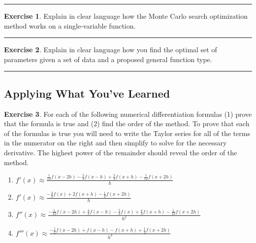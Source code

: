 \documentclass[
]{book}
\theoremstyle{definition}
\theoremstyle{definition}
\theoremstyle{definition}
\newtheorem{exercise}{Exercise}[chapter]
\theoremstyle{remark}
\begin{document}
\begin{center}\rule{0.5\linewidth}{0.5pt}\end{center}

\begin{exercise}
\protect\hypertarget{exr:unnamed-chunk-257}{}{\label{exr:unnamed-chunk-257} }Explain in clear language how the Monte Carlo search optimization method
works on a single-variable function.
\end{exercise}

\begin{center}\rule{0.5\linewidth}{0.5pt}\end{center}

\begin{exercise}
\protect\hypertarget{exr:unnamed-chunk-258}{}{\label{exr:unnamed-chunk-258} }Explain in clear language how you find the optimal set of parameters
given a set of data and a proposed general function type.
\end{exercise}

\begin{center}\rule{0.5\linewidth}{0.5pt}\end{center}

\hypertarget{applying-what-youve-learned-2}{%
\subsection{Applying What You've Learned}\label{applying-what-youve-learned-2}}

\begin{exercise}
\protect\hypertarget{exr:unnamed-chunk-259}{}{\label{exr:unnamed-chunk-259} }For each of the following numerical differentiation formulas (1) prove
that the formula is true and (2) find the order of the method. To prove
that each of the formulas is true you will need to write the Taylor
series for all of the terms in the numerator on the right and then
simplify to solve for the necessary derivative. The highest power of the
remainder should reveal the order of the method.

\begin{enumerate}
\def\labelenumi{\alph{enumi}.}
\item
  \(f'(x) \approx \frac{\frac{1}{12} f(x-2h) - \frac{2}{3} f(x-h) +  \frac{2}{3} f(x+h) - \frac{1}{12} f(x+2h)}{h}\)
\item
  \(f'(x) \approx \frac{-\frac{3}{2} f(x) + 2 f(x+h) -  \frac{1}{2} f(x+2h)}{h}\)
\item
  \(f''(x) \approx \frac{-\frac{1}{12} f(x-2h) + \frac{4}{3} f(x-h) -  \frac{5}{2} f(x) + \frac{4}{3} f(x+h) - \frac{1}{12} f(x+2h)}{h^2}\)
\item
  \(f'''(x) \approx \frac{-\frac{1}{2} f(x-2h) + f(x-h) - f(x+h) +  \frac{1}{2} f(x+2h)}{h^3}\)
\end{enumerate}
\end{exercise}
\end{document}
